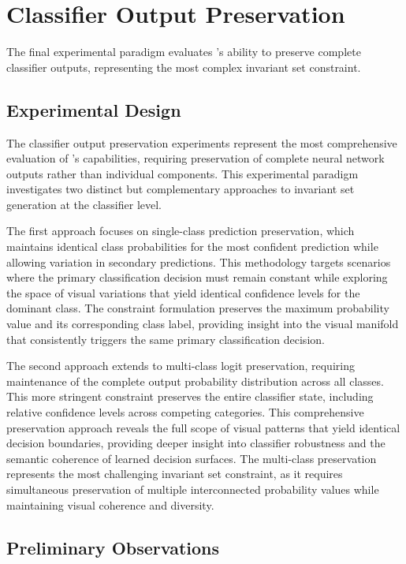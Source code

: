 \section{Classifier Output Preservation}

The final experimental paradigm evaluates \method{}'s ability to preserve complete classifier outputs, representing the most complex invariant set constraint.

\subsection{Experimental Design}

The classifier output preservation experiments represent the most comprehensive evaluation of \method{}'s capabilities, requiring preservation of complete neural network outputs rather than individual components. This experimental paradigm investigates two distinct but complementary approaches to invariant set generation at the classifier level.

The first approach focuses on single-class prediction preservation, which maintains identical class probabilities for the most confident prediction while allowing variation in secondary predictions. This methodology targets scenarios where the primary classification decision must remain constant while exploring the space of visual variations that yield identical confidence levels for the dominant class. The constraint formulation preserves the maximum probability value and its corresponding class label, providing insight into the visual manifold that consistently triggers the same primary classification decision.

The second approach extends to multi-class logit preservation, requiring maintenance of the complete output probability distribution across all classes. This more stringent constraint preserves the entire classifier state, including relative confidence levels across competing categories. This comprehensive preservation approach reveals the full scope of visual patterns that yield identical decision boundaries, providing deeper insight into classifier robustness and the semantic coherence of learned decision surfaces. The multi-class preservation represents the most challenging invariant set constraint, as it requires simultaneous preservation of multiple interconnected probability values while maintaining visual coherence and diversity.

\subsection{Preliminary Observations}

